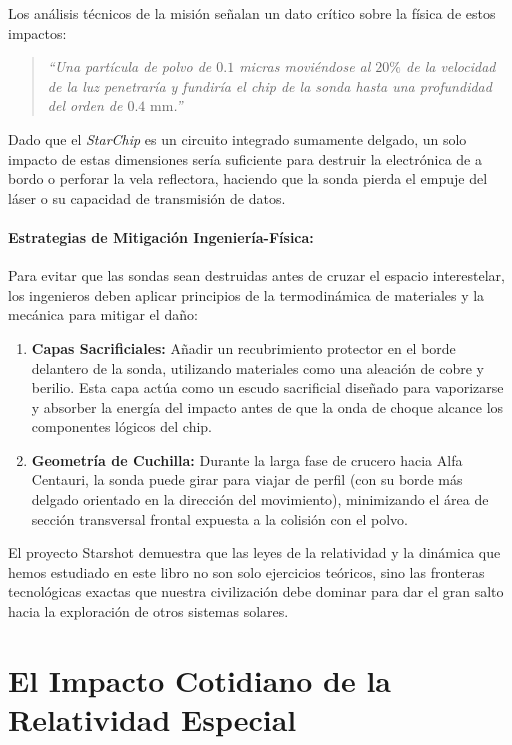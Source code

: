 \documentclass[11pt,a4paper]{book}
\begin{document}
Los análisis técnicos de la misión señalan un dato crítico sobre la física de estos impactos:
\begin{quote}
    \textit{``Una partícula de polvo de $0.1$ micras moviéndose al $20\%$ de la velocidad de la luz penetraría y fundiría el chip de la sonda hasta una profundidad del orden de $0.4 \text{ mm}$.''}
\end{quote}

Dado que el \textit{StarChip} es un circuito integrado sumamente delgado, un solo impacto de estas dimensiones sería suficiente para destruir la electrónica de a bordo o perforar la vela reflectora, haciendo que la sonda pierda el empuje del láser o su capacidad de transmisión de datos.

\paragraph{Estrategias de Mitigación Ingeniería-Física:}
Para evitar que las sondas sean destruidas antes de cruzar el espacio interestelar, los ingenieros deben aplicar principios de la termodinámica de materiales y la mecánica para mitigar el daño:
\begin{enumerate}
    \item \textbf{Capas Sacrificiales:} Añadir un recubrimiento protector en el borde delantero de la sonda, utilizando materiales como una aleación de cobre y berilio. Esta capa actúa como un escudo sacrificial diseñado para vaporizarse y absorber la energía del impacto antes de que la onda de choque alcance los componentes lógicos del chip.
    \item \textbf{Geometría de Cuchilla:} Durante la larga fase de crucero hacia Alfa Centauri, la sonda puede girar para viajar de perfil (con su borde más delgado orientado en la dirección del movimiento), minimizando el área de sección transversal frontal expuesta a la colisión con el polvo.
\end{enumerate}

El proyecto Starshot demuestra que las leyes de la relatividad y la dinámica que hemos estudiado en este libro no son solo ejercicios teóricos, sino las fronteras tecnológicas exactas que nuestra civilización debe dominar para dar el gran salto hacia la exploración de otros sistemas solares.




\section{El Impacto Cotidiano de la Relatividad Especial}
\end{document}
